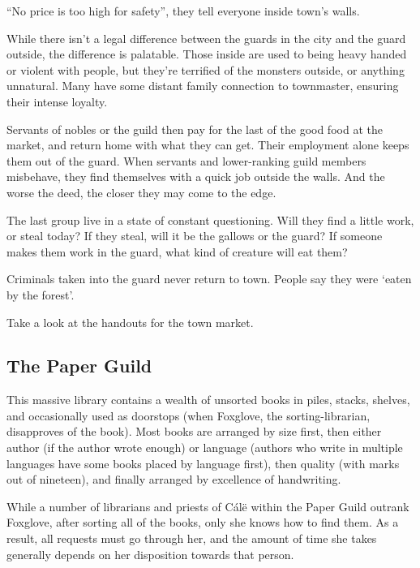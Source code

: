 ``No price is too high for safety'', they tell everyone inside \gls{town}'s walls.

While there isn't a legal difference between the guards in the city and the \gls{guard} outside, the difference is palatable.
Those inside are used to being heavy handed or violent with people, but they're terrified of the monsters outside, or anything unnatural.
Many have some distant family connection to \gls{townmaster}, ensuring their intense loyalty.

Servants of nobles or the guild then pay for the last of the good food at the market, and return home with what they can get.
Their employment alone keeps them out of the \gls{guard}.
When servants and lower-ranking guild members misbehave, they find themselves with a quick job outside the walls.
And the worse the deed, the closer they may come to the \gls{edge}.

The last group live in a state of constant questioning.
Will they find a little work, or steal today?
If they steal, will it be the gallows or the guard?
If someone makes them work in the \gls{guard}, what kind of creature will eat them?

Criminals taken into the \gls{guard} never return to \gls{town}.
People say they were `eaten by the forest'.

Take a look at the handouts for the \gls{town} market.

\subsection{The Paper Guild}
\label{paperGuild}

This massive library contains a wealth of unsorted books in piles, stacks, shelves, and occasionally used as doorstops (when Foxglove, the sorting-librarian, disapproves of the book).
Most books are arranged by size first, then either author (if the author wrote enough) or language (authors who write in multiple languages have some books placed by language first), then quality (with marks out of nineteen), and finally arranged by excellence of handwriting.


While a number of librarians and priests of C\'al\"e within the Paper Guild outrank Foxglove, after sorting all of the books, only she knows how to find them.
As a result, all requests must go through her, and the amount of time she takes generally depends on her disposition towards that person.

